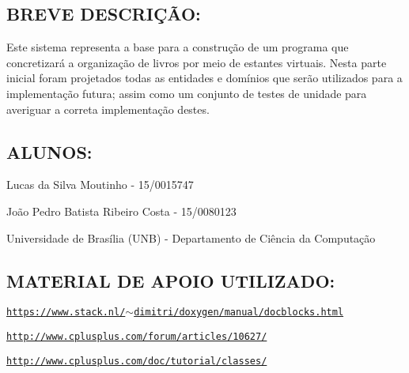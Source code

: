 \subsection*{B\+R\+E\+VE D\+E\+S\+C\+R\+IÇÃO\+:}

Este sistema representa a base para a construção de um programa que concretizará a organização de livros por meio de estantes virtuais. Nesta parte inicial foram projetados todas as entidades e domínios que serão utilizados para a implementação futura; assim como um conjunto de testes de unidade para averiguar a correta implementação destes.

\subsection*{A\+L\+U\+N\+OS\+:}


\begin{DoxyItemize}
\item Lucas da Silva Moutinho -\/ 15/0015747
\item João Pedro Batista Ribeiro Costa -\/ 15/0080123
\item Universidade de Brasília (U\+NB) -\/ Departamento de Ciência da Computação
\end{DoxyItemize}

\subsection*{M\+A\+T\+E\+R\+I\+AL DE A\+P\+O\+IO U\+T\+I\+L\+I\+Z\+A\+DO\+:}


\begin{DoxyItemize}
\item \href{https://www.stack.nl/~dimitri/doxygen/manual/docblocks.html}{\tt https\+://www.\+stack.\+nl/$\sim$dimitri/doxygen/manual/docblocks.\+html}
\item \href{http://www.cplusplus.com/forum/articles/10627/}{\tt http\+://www.\+cplusplus.\+com/forum/articles/10627/}
\item \href{http://www.cplusplus.com/doc/tutorial/classes/}{\tt http\+://www.\+cplusplus.\+com/doc/tutorial/classes/} 
\end{DoxyItemize}
